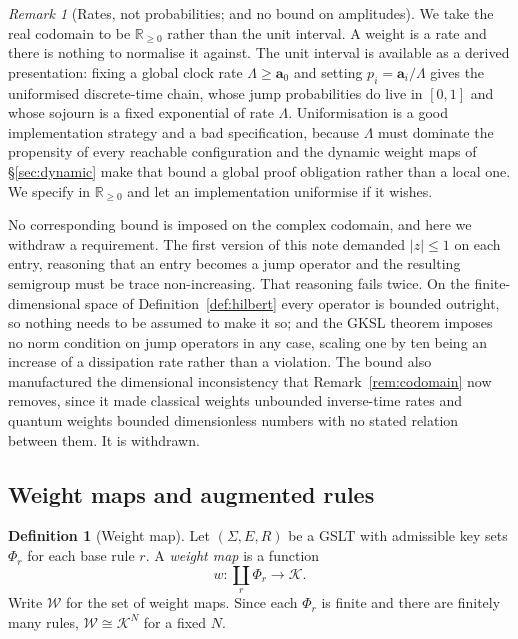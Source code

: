 \documentclass[11pt,a4paper]{article}
\theoremstyle{plain}
\theoremstyle{definition}
\newtheorem{definition}[theorem]{Definition}
\theoremstyle{remark}
\newtheorem{remark}[theorem]{Remark}
\newcommand{\Rnn}{\mathbb{R}_{\geq 0}}
\newcommand{\Wt}{\mathcal{W}}
\newcommand{\prop}{\mathbf{a}}
\newcommand{\wmap}{w}
\begin{document}
\begin{remark}[Rates, not probabilities; and no bound on amplitudes]
\label{rem:rnn}
We take the real codomain to be $\Rnn$ rather than the unit interval. A weight is a rate and there is
nothing to normalise it against. The unit interval is available as a derived presentation: fixing a
global clock rate $\Lambda \geq \prop_0$ and setting $p_i = \prop_i / \Lambda$ gives the uniformised
discrete-time chain, whose jump probabilities do live in $[0,1]$ and whose sojourn is a fixed
exponential of rate $\Lambda$. Uniformisation is a good implementation strategy and a bad
specification, because $\Lambda$ must dominate the propensity of every reachable configuration and
the dynamic weight maps of \S\ref{sec:dynamic} make that bound a global proof obligation rather than
a local one. We specify in $\Rnn$ and let an implementation uniformise if it wishes.

No corresponding bound is imposed on the complex codomain, and here we withdraw a requirement. The
first version of this note demanded $|z| \le 1$ on each entry, reasoning that an entry becomes a jump
operator and the resulting semigroup must be trace non-increasing. That reasoning fails twice. On the
finite-dimensional space of Definition~\ref{def:hilbert} every operator is bounded outright, so
nothing needs to be assumed to make it so; and the GKSL theorem imposes no norm condition on jump
operators in any case, scaling one by ten being an increase of a dissipation rate rather than a
violation. The bound also manufactured the dimensional inconsistency that
Remark~\ref{rem:codomain} now removes, since it made classical weights unbounded inverse-time rates
and quantum weights bounded dimensionless numbers with no stated relation between them. It is
withdrawn.
\end{remark}

\subsection{Weight maps and augmented rules}

\begin{definition}[Weight map]
\label{def:wmap}
Let $(\Sigma, E, R)$ be a GSLT with admissible key sets $\Phi_r$ for each base rule $r$. A
\emph{weight map} is a function
\[
\wmap : \textstyle\coprod_{r} \Phi_r \longrightarrow \mathcal{K}.
\]
Write $\Wt$ for the set of weight maps. Since each $\Phi_r$ is finite and there are finitely many
rules, $\Wt \cong \mathcal{K}^N$ for a fixed $N$.
\end{definition}
\end{document}
